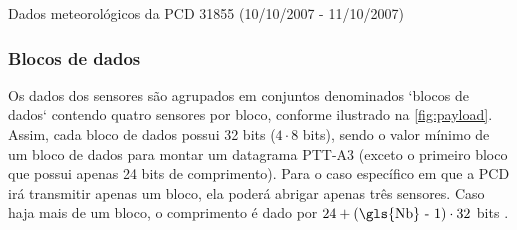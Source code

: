 \begin{quadro}[H]
\caption{Dados meteorológicos da PCD 31855 (10/10/2007 - 11/10/2007)}\label{quadro:dados-meteorologicos}

\end{quadro}


\subsubsection{Blocos de dados}

Os dados dos sensores são agrupados em conjuntos denominados `blocos de dados` contendo quatro sensores por bloco, conforme ilustrado na \autoref{fig:payload}. Assim, cada bloco de dados possui 32 bits ($4 \cdot 8$ bits), sendo o valor mínimo de um bloco de dados para montar um datagrama \gls{PTT-A3} (exceto o primeiro bloco que possui apenas 24 bits de comprimento). Para o caso específico em que a PCD irá transmitir apenas um bloco, ela poderá abrigar apenas três sensores. Caso haja mais de um bloco, o comprimento é dado por $24 + (\text{\gls{Nb} - 1}) \cdot 32$ bits \textcite{cnes_services_and_message_formats_ed2_rev2_2006}.

